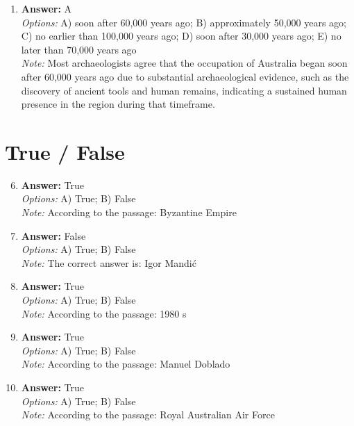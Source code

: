 \documentclass[12pt]{article}
\begin{document}
\begin{enumerate}[label=\arabic*.]
\\ \textit{Note:} Homo sapiens and Australopithecus afarensis share a mode of locomotion characterized by bipedalism, which is a defining trait of both species and highlights their evolutionary adaptation to walking on two legs.
\item \textbf{Answer:} A
\\ \textit{Options:} A) soon after 60,000 years ago; B) approximately 50,000 years ago; C) no earlier than 100,000 years ago; D) soon after 30,000 years ago; E) no later than 70,000 years ago
\\ \textit{Note:} Most archaeologists agree that the occupation of Australia began soon after 60,000 years ago due to substantial archaeological evidence, such as the discovery of ancient tools and human remains, indicating a sustained human presence in the region during that timeframe.
\end{enumerate}

\section*{True / False}
\begin{enumerate}[label=\arabic*.]
\setcounter{enumi}{5}
\item \textbf{Answer:} True
\\ \textit{Options:} A) True; B) False
\\ \textit{Note:} According to the passage: Byzantine Empire
\item \textbf{Answer:} False
\\ \textit{Options:} A) True; B) False
\\ \textit{Note:} The correct answer is: Igor Mandić
\item \textbf{Answer:} True
\\ \textit{Options:} A) True; B) False
\\ \textit{Note:} According to the passage: 1980 s
\item \textbf{Answer:} True
\\ \textit{Options:} A) True; B) False
\\ \textit{Note:} According to the passage: Manuel Doblado
\item \textbf{Answer:} True
\\ \textit{Options:} A) True; B) False
\\ \textit{Note:} According to the passage: Royal Australian Air Force
\end{enumerate}
\end{document}
